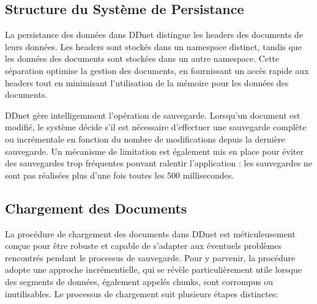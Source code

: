 \subsection{Structure du Système de Persistance}

La persistance des données dans \gls{DDnet} distingue les headers des documents de leurs données. Les headers sont stockés dans un namespace distinct, tandis que les données des documents sont stockées dans un autre namespace. Cette séparation optimise la gestion des documents, en fournissant un accès rapide aux headers tout en minimisant l'utilisation de la mémoire pour les données des documents.

\gls{DDnet} gère intelligemment l'opération de sauvegarde. Lorsqu'un document est modifié, le système décide s'il est nécessaire d'effectuer une sauvegarde complète ou incrémentale en fonction du nombre de modifications depuis la dernière sauvegarde. Un mécanisme de limitation est également mis en place pour éviter des sauvegardes trop fréquentes pouvant ralentir l'application : les sauvegardes ne sont pas réalisées plus d'une fois toutes les 500 millisecondes.

\subsection{Chargement des Documents}

La procédure de chargement des documents dans \gls{DDnet} est méticuleusement conçue pour être robuste et capable de s'adapter aux éventuels problèmes rencontrés pendant le processus de sauvegarde. Pour y parvenir, la procédure adopte une approche incrémentielle, qui se révèle particulièrement utile lorsque des segments de données, également appelés \guillemotleft chunks\guillemotright, sont corrompus ou inutilisables. Le processus de chargement suit plusieurs étapes distinctes:

